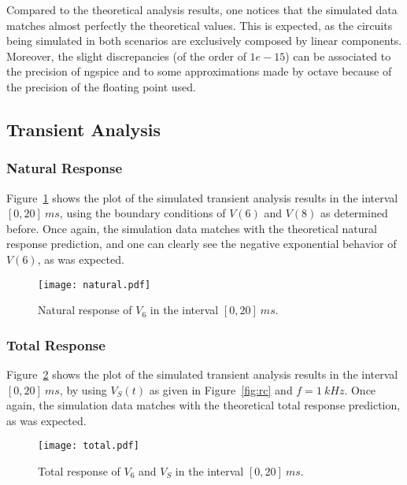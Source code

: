 \par Compared to the theoretical analysis results, one notices that the simulated data matches almost perfectly the theoretical values. This is expected, as the circuits being simulated in both scenarios are exclusively composed by linear components. Moreover, the slight discrepancies (of the order of $1e-15$) can be associated to the precision of ngspice and to some approximations made by octave because of the precision of the floating point used.

\newpage
\subsection{Transient Analysis}

\subsubsection{Natural Response}

Figure~\ref{fig:trans} shows the plot of the simulated transient analysis results in the interval $[0, 20]~ms$, using the boundary conditions of $V(6)$ and $V(8)$ as determined before. 
Once again, the simulation data matches with the theoretical natural response prediction, and one can clearly see the negative exponential behavior of $V(6)$, as was expected.

\begin{figure}[h] \centering
\texttt{[image: natural.pdf]}
\caption{Natural response of $V_{6}$ in the interval $[0, 20]~ms$.}
\label{fig:trans}
\end{figure}

\newpage

\subsubsection{Total Response}

Figure~\ref{fig:totalsim} shows the plot of the simulated transient analysis results in the interval $[0, 20]~ms$, by using $V_S(t)$ as given in Figure~\ref{fig:rc} and $f = 1~kHz$. 
Once again, the simulation data matches with the theoretical total response prediction, as was expected.
                                    

\begin{figure}[h] \centering
\texttt{[image: total.pdf]}
\caption{Total response of $V_{6}$ and $V_S$ in the interval $[0, 20]~ms$.}
\label{fig:totalsim}
\end{figure}

